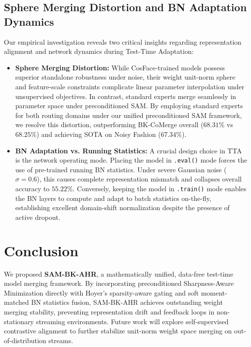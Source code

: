 \documentclass{article}
\theoremstyle{plain}
\theoremstyle{definition}
\theoremstyle{remark}
\begin{document}
\subsection{Sphere Merging Distortion and BN Adaptation Dynamics}
Our empirical investigation reveals two critical insights regarding representation alignment and network dynamics during Test-Time Adaptation:
\begin{itemize}
    \item \textbf{Sphere Merging Distortion:} While CosFace-trained models possess superior standalone robustness under noise, their weight unit-norm sphere and feature-scale constraints complicate linear parameter interpolation under unsupervised objectives. In contrast, standard experts merge seamlessly in parameter space under preconditioned SAM. By employing standard experts for both routing domains under our unified preconditioned SAM framework, we resolve this distortion, outperforming BK-CoMerge overall ($68.31\%$ vs $68.25\%$) and achieving SOTA on Noisy Fashion ($67.34\%$).
    \item \textbf{BN Adaptation vs. Running Statistics:} A crucial design choice in TTA is the network operating mode. Placing the model in \texttt{.eval()} mode forces the use of pre-trained running BN statistics. Under severe Gaussian noise ($\sigma=0.6$), this causes complete representation mismatch and collapses overall accuracy to $55.22\%$. Conversely, keeping the model in \texttt{.train()} mode enables the BN layers to compute and adapt to batch statistics on-the-fly, establishing excellent domain-shift normalization despite the presence of active dropout.
\end{itemize}

\section{Conclusion}
\label{sec:conclusion}
We proposed \textbf{SAM-BK-AHR}, a mathematically unified, data-free test-time model merging framework. By incorporating preconditioned Sharpness-Aware Minimization directly with Hoyer's sparsity-aware gating and soft moment-matched BN statistics fusion, SAM-BK-AHR achieves outstanding weight merging stability, preventing representation drift and feedback loops in non-stationary streaming environments. Future work will explore self-supervised contrastive alignment to further stabilize unit-norm weight space merging on out-of-distribution streams.



\end{document}
